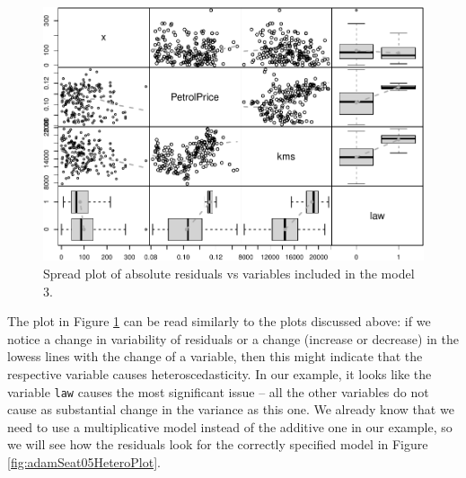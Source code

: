 \documentclass[
]{book}
\newenvironment{Shaded}{\begin{snugshade}}{\end{snugshade}}
\newcommand{\AttributeTok}[1]{\textcolor[rgb]{0.77,0.63,0.00}{#1}}
\newcommand{\ConstantTok}[1]{\textcolor[rgb]{0.00,0.00,0.00}{#1}}
\newcommand{\DecValTok}[1]{\textcolor[rgb]{0.00,0.00,0.81}{#1}}
\newcommand{\FunctionTok}[1]{\textcolor[rgb]{0.00,0.00,0.00}{#1}}
\newcommand{\NormalTok}[1]{#1}
\newcommand{\SpecialCharTok}[1]{\textcolor[rgb]{0.00,0.00,0.00}{#1}}
\theoremstyle{definition}
\theoremstyle{definition}
\theoremstyle{definition}
\theoremstyle{definition}
\theoremstyle{remark}
\begin{document}
\begin{Shaded}
\end{Shaded}

\begin{figure}
\centering
\includegraphics{Svetunkov--2022----ADAM_files/figure-latex/adamSeat03Spread-1.pdf}
\caption{\label{fig:adamSeat03Spread}Spread plot of absolute residuals vs variables included in the model 3.}
\end{figure}

The plot in Figure \ref{fig:adamSeat03Spread} can be read similarly to the plots discussed above: if we notice a change in variability of residuals or a change (increase or decrease) in the lowess lines with the change of a variable, then this might indicate that the respective variable causes heteroscedasticity. In our example, it looks like the variable \texttt{law} causes the most significant issue -- all the other variables do not cause as substantial change in the variance as this one. We already know that we need to use a multiplicative model instead of the additive one in our example, so we will see how the residuals look for the correctly specified model in Figure \ref{fig:adamSeat05HeteroPlot}.
\end{document}
